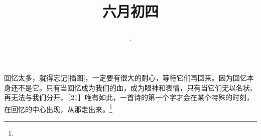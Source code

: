 \title{\date[d=9,m=7,y=2024][year:cn-y,年,month:cn,day:cn,日,·,weekday]·六月初四 }
回忆太多，就得忘记[插图]，一定要有很大的耐心，等待它们再回来。因为回忆本身还不是它。只有当回忆成为我们的血，成为眼神和表情，只有当它们无以名状、再无法与我们分开，［21］唯有如此，一首诗的第一个字才会在某个特殊的时刻，在回忆的中心出现，从那走出来。\footnote{ }

